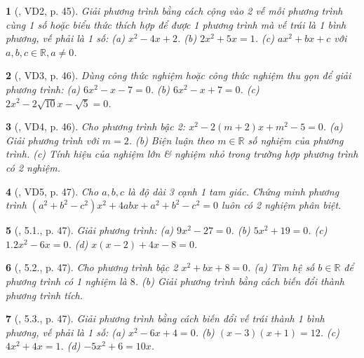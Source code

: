 \documentclass{article}
\newtheorem{baitoan}{}
\begin{document}
\begin{baitoan}[\cite{Binh_boi_duong_Toan_9_tap_2}, VD2, p. 45]
	Giải phương trình bằng cách cộng vào 2 vế mỗi phương trình cùng 1 số hoặc biểu thức thích hợp để được 1 phương trình mà vế trái là 1 bình phương, vế phải là 1 số: (a) $x^2 - 4x + 2$. (b) $2x^2 + 5x = 1$. (c) $ax^2 + bx + c$ với $a,b,c\in\mathbb{R},a\ne0$.
\end{baitoan}

\begin{baitoan}[\cite{Binh_boi_duong_Toan_9_tap_2}, VD3, p. 46]
	Dùng công thức nghiệm hoặc công thức nghiệm thu gọn để giải phương trình: (a) $6x^2 - x - 7 = 0$. (b) $6x^2 - x + 7 = 0$. (c) $2x^2 - 2\sqrt{10}x - \sqrt{5} = 0$.
\end{baitoan}

\begin{baitoan}[\cite{Binh_boi_duong_Toan_9_tap_2}, VD4, p. 46]
	Cho phương trình bậc 2: $x^2 - 2(m + 2)x + m^2 - 5 = 0$. (a) Giải phương trình với $m = 2$. (b) Biện luận theo $m\in\mathbb{R}$ số nghiệm của phương trình. (c) Tính hiệu của nghiệm lớn \& nghiệm nhỏ trong trường hợp phương trình có 2 nghiệm.
\end{baitoan}

\begin{baitoan}[\cite{Binh_boi_duong_Toan_9_tap_2}, VD5, p. 47]
	Cho $a,b,c$ là độ dài 3 cạnh 1 tam giác. Chứng minh phương trình $(a^2 + b^2 - c^2)x^2 + 4abx + a^2 + b^2 - c^2 = 0$ luôn có 2 nghiệm phân biệt.
\end{baitoan}

\begin{baitoan}[\cite{Binh_boi_duong_Toan_9_tap_2}, 5.1., p. 47]
	Giải phương trình: (a) $9x^2 - 27 = 0$. (b) $5x^2 + 19 = 0$. (c) $1.2x^2 - 6x = 0$. (d) $x(x - 2) + 4x - 8 = 0$.
\end{baitoan}

\begin{baitoan}[\cite{Binh_boi_duong_Toan_9_tap_2}, 5.2., p. 47]
	Cho phương trình bậc 2 $x^2 + bx + 8 = 0$. (a) Tìm hệ số $b\in\mathbb{R}$ để phương trình có 1 nghiệm là $8$. (b) Giải phương trình bằng cách biến đổi thành phương trình tích.
\end{baitoan}

\begin{baitoan}[\cite{Binh_boi_duong_Toan_9_tap_2}, 5.3., p. 47]
	Giải phương trình bằng cách biến đổi vế trái thành 1 bình phương, vế phải là 1 số: (a) $x^2 - 6x + 4 = 0$. (b) $(x - 3)(x + 1) = 12$. (c) $4x^2 + 4x = 1$. (d) $-5x^2 + 6 = 10x$.
\end{baitoan}
\end{document}
